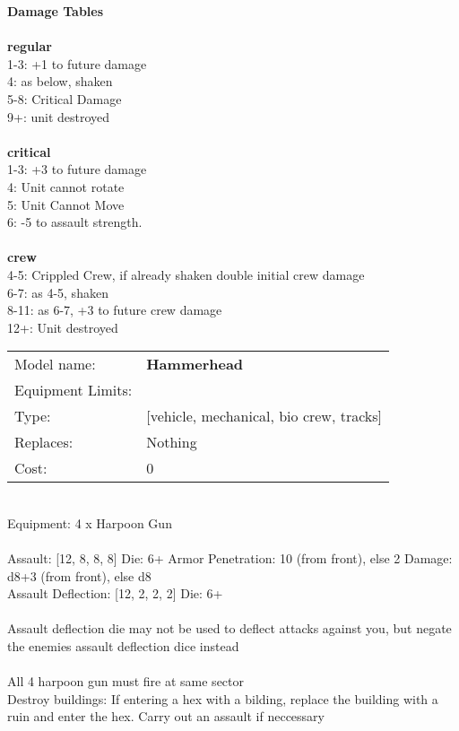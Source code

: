 {\bf Damage Tables} \\
\ \\ {\bf regular } \\
1-3: +1 to future damage \\
4: as below, shaken \\
5-8: Critical Damage \\
9+: unit destroyed \\
\ \\ {\bf critical } \\
1-3: +3 to future damage \\
4: Unit cannot rotate \\
5: Unit Cannot Move \\
6: -5 to assault strength. \\
\ \\ {\bf crew } \\
4-5: Crippled Crew, if already shaken double initial crew damage \\
6-7: as 4-5, shaken \\
8-11: as 6-7, +3 to future crew damage \\
12+: Unit destroyed \\


\noindent
\begin{tabular}{ll}
Model name: &{\bf Hammerhead } \\
Equipment Limits: & \\
Type: &[vehicle, mechanical, bio crew, tracks] \\
Replaces: &Nothing \\
Cost: & 0\\
\end{tabular}
\ \\
Equipment: 4 x Harpoon Gun \\
\ \\
Assault: [12, 8, 8, 8] Die: 6+ Armor Penetration: 10 (from front), else 2 Damage: d8+3 (from front), else d8 \\
Assault Deflection: [12, 2, 2, 2] Die: 6+\\
\\ 
Assault deflection die may not be used to deflect attacks against you, but negate the enemies assault deflection dice instead\\ 
 
\ \\
All 4 harpoon gun must fire at same sector\\ 
Destroy buildings: If entering a hex with a bilding, replace the building with a ruin and enter the hex. Carry out an assault if neccessary\\ 

